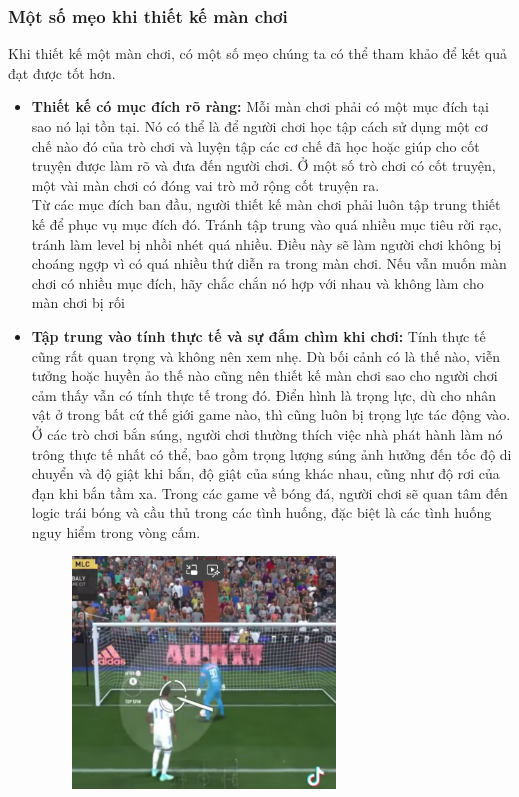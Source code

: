 \subsubsection{Một số mẹo khi thiết kế màn chơi}
\hspace*{1cm}  Khi thiết kế một màn chơi, có một số mẹo chúng ta có thể tham khảo để kết quả đạt được tốt hơn.
\begin{itemize}
	\item \textbf{Thiết kế có mục đích rõ ràng: } Mỗi màn chơi phải có một mục đích tại sao nó lại tồn tại. Nó có thể là để người chơi học tập cách sử dụng một cơ chế nào đó của trò chơi và luyện tập các cơ chế đã học hoặc giúp cho cốt truyện được làm rõ và đưa đến người chơi. Ở một số trò chơi có cốt truyện, một vài màn chơi có đóng vai trò mở rộng cốt truyện ra.\\
	Từ các mục đích ban đầu, người thiết kế màn chơi phải luôn tập trung thiết kế để phục vụ mục đích đó. Tránh tập trung vào quá nhiều mục tiêu rời rạc, tránh làm level bị nhồi nhét quá nhiều. Điều này sẽ làm người chơi không bị choáng ngợp vì có quá nhiều thứ diễn ra trong màn chơi. Nếu vẫn muốn màn chơi có nhiều mục đích, hãy chắc chắn nó hợp với nhau và không làm cho màn chơi bị rối
	\item \textbf{Tập trung vào tính thực tế và sự đắm chìm khi chơi: } Tính thực tế cũng rất quan trọng và không nên xem nhẹ. Dù bối cảnh có là thế nào, viễn tưởng hoặc huyền ảo thế nào cũng nên thiết kế màn chơi sao cho người chơi cảm thấy vẫn có tính thực tế trong đó. Điển hình là trọng lực, dù cho nhân vật ở trong bất cứ thế giới game nào, thì cũng luôn bị trọng lực tác động vào. Ở các trò chơi bắn súng, người chơi thường thích việc nhà phát hành làm nó trông thực tế nhất có thể, bao gồm trọng lượng súng ảnh hưởng đến tốc độ di chuyển và độ giật khi bắn, độ giật của súng khác nhau, cũng như độ rơi của đạn khi bắn tầm xa. Trong các game về bóng đá, người chơi sẽ quan tâm đến logic trái bóng và cầu thủ trong các tình huống, đặc biệt là các tình huống nguy hiểm trong vòng cấm.\\
	\begin{figure}[H]
		\centering
		\includegraphics[width=7cm]{Images/FIFAGlitch.png}

\end{figure}
\end{itemize}
